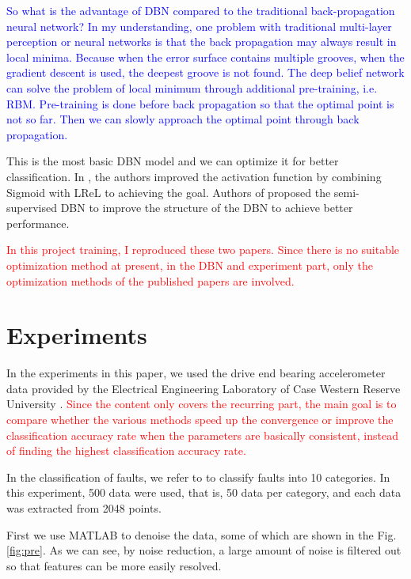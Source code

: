 \documentclass{modified}
\begin{document}
\textcolor{blue}{So what is the advantage of DBN compared to the traditional back-propagation neural network? In my understanding, one problem with traditional multi-layer perception or neural networks is that the back propagation may always result in local minima. Because when the error surface contains multiple grooves, when the gradient descent is used, the deepest groove is not found. The deep belief network can solve the problem of local minimum through additional pre-training, i.e. RBM. Pre-training is done before back propagation so that the optimal point is not so far. Then we can slowly approach the optimal point through back propagation.}

This is the most basic DBN model and we can optimize it for better classification. In \cite{YiThe}, the authors improved the activation function by combining Sigmoid with LReL to achieving the goal. Authors of \cite{wang2017improved} proposed the semi-supervised DBN to improve the structure of the DBN to achieve better performance.

\textcolor{red}{In this project training, I reproduced these two papers. Since there is no suitable optimization method at present, in the DBN and experiment part, only the optimization methods of the published papers are involved.}
\section{Experiments}
In the experiments in this paper, we used the drive end bearing accelerometer data provided by the Electrical Engineering Laboratory of Case Western Reserve University \cite{data}. \textcolor{red}{Since the content only covers the recurring part, the main goal is to compare whether the various methods speed up the convergence or improve the classification accuracy rate when the parameters are basically consistent, instead of finding the highest classification accuracy rate.}

In the classification of faults, we refer to \cite{guangquan2016fault} to classify faults into 10 categories. In this experiment, 500 data were used, that is, 50 data per category, and each data was extracted from 2048 points.

First we use MATLAB to denoise the data, some of which are shown in the Fig. \ref{fig:pre}. As we can see, by noise reduction, a large amount of noise is filtered out so that features can be more easily resolved.
\end{document}
